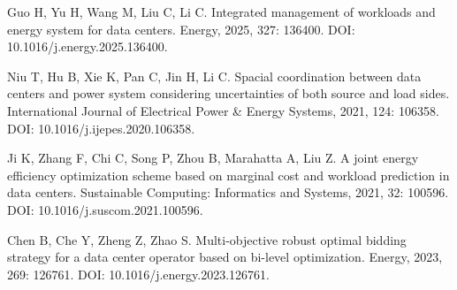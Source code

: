 Guo H, Yu H, Wang M, Liu C, Li C. Integrated management of workloads and energy system for data centers. Energy, 2025, 327: 136400. DOI: 10.1016/j.energy.2025.136400.

Niu T, Hu B, Xie K, Pan C, Jin H, Li C. Spacial coordination between data centers and power system considering uncertainties of both source and load sides. International Journal of Electrical Power \& Energy Systems, 2021, 124: 106358. DOI: 10.1016/j.ijepes.2020.106358.

Ji K, Zhang F, Chi C, Song P, Zhou B, Marahatta A, Liu Z. A joint energy efficiency optimization scheme based on marginal cost and workload prediction in data centers. Sustainable Computing: Informatics and Systems, 2021, 32: 100596. DOI: 10.1016/j.suscom.2021.100596.


Chen B, Che Y, Zheng Z, Zhao S. Multi-objective robust optimal bidding strategy for a data center operator based on bi-level optimization. Energy, 2023, 269: 126761. DOI: 10.1016/j.energy.2023.126761.
